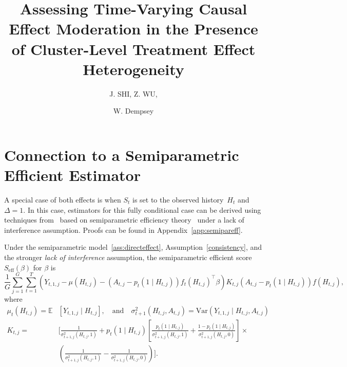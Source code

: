 \documentclass[supplementary, lineno]{biometrika}
\begin{document}

\title{Assessing Time-Varying Causal Effect Moderation in the Presence of Cluster-Level Treatment Effect Heterogeneity}

\author{J. SHI, Z. WU, \and W. Dempsey}

\maketitle

\appendix



\section{Connection to a Semiparametric Efficient Estimator}
\label{sec:semipar}

A special case of both effects is when $S_t$ is set to the observed history~$H_t$ and~$\Delta = 1$.  In this case, estimators for this fully conditional case can be derived using techniques from~\cite{Robins1994} based on semiparametric efficiency theory~\citep{Newey1990,Tsiatis2007} under a lack of interference assumption.  Proofs can be found in Appendix~\ref{app:semipareff}.

\begin{lemma}
Under the semiparametric model~\eqref{ass:directeffect}, Assumption~\ref{consistency}, and the stronger \emph{lack of interference} assumption, the semiparametric efficient score~$S_{\text{eff}} (\beta)$ for $\beta$ is
\begin{equation}
\label{eq:effscore}
\frac{1}{G} \sum_{j=1}^G \sum_{t=1}^T (Y_{t,1,j} - \mu (H_{t,j}) - (A_{t,j} - p_t (1 \mid H_{t,j})) f_t (H_{t,j})^\top \beta ) K_{t,j} (A_{t,j} - p_t(1 \mid H_{t,j})) f(H_{t,j}),
\end{equation}
where
\begin{align*}
\mu_t (H_{t,j}) = \mathbb{E} &\left[ Y_{t,1,j} \mid H_{t,j} \right], \quad \text{and} \quad \sigma^2_{t+1} (H_{t,j}, A_{t,j}) = \text{Var} \left( Y_{t,1,j} \mid H_{t,j}, A_{t,j} \right) \\
K_{t,j} = &\bigg[ \frac{1}{\sigma^2_{t+1,j} (H_{t,j}, 1)} + p_t ( 1 \mid H_{t,j}) \left[  \frac{p_t (1 \mid H_{t,j} )}{\sigma^2_{t+1,j} (H_{t,j}, 1)} + \frac{1-p_t (1 \mid H_{t,j} )}{\sigma^2_{t+1,j} (H_{t,j}, 0)} \right] \times \\
&\left( \frac{1}{\sigma^2_{t+1,j} (H_{t,j}, 1)}  - \frac{1}{\sigma^2_{t+1,j} (H_{t,j}, 0)} \right)
 \bigg].
\end{align*}
\end{lemma}
\end{document}
